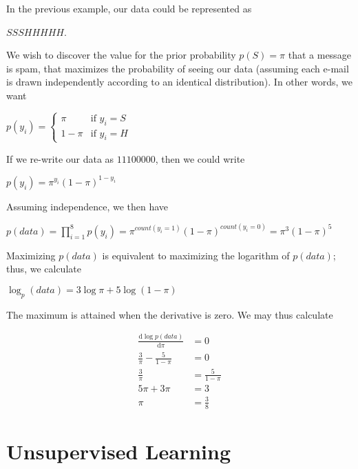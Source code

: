 \documentclass[10pt,a4paper]{article}
\begin{document}
In the previous example, our data could be represented as
\begin{center}
$SSSHHHHH$.
\end{center}
We wish to discover the value for the prior probability $p(S) = \pi$ that a message is spam, that maximizes the probability of seeing our data (assuming each e-mail is drawn independently according to an identical distribution). In other words, we want
\begin{center}
$p(y_i) =
\begin{cases}
\pi & \text{if } y_i = S \\
1 - \pi & \text{if } y_i = H
\end{cases}$
\end{center}
If we re-write our data as $11100000$, then we could write
\begin{center}
$p(y_i) = \pi^{y_i} (1-\pi)^{1 - y_i}$
\end{center}
Assuming independence, we then have
\begin{center}
$p(data) = \displaystyle\prod_{i=1}^8 p(y_i) = \pi^{count(y_i=1)}(1-\pi)^{count(y_i = 0)} = \pi^3(1-\pi)^5$
\end{center}
Maximizing $p(data)$ is equivalent to maximizing the logarithm of $p(data)$; thus, we calculate
\begin{center}
$\log_p(data) = 3\log\pi + 5\log(1-\pi)$
\end{center}
The maximum is attained when the derivative is zero. We may thus calculate
\begin{center}
\begin{align*}
\displaystyle\frac{\mathrm{d}\log p(data)}{\mathrm{d}\pi} & = 0 \\
\frac{3}{\pi} - \frac{5}{1-\pi} & = 0 \\
\frac{3}{\pi} & = \frac{5}{1-\pi} \\
5\pi + 3\pi & = 3 \\
\pi & = \frac{3}{8}
\end{align*}
\end{center}


\part{Unsupervised Learning}

\end{document}
